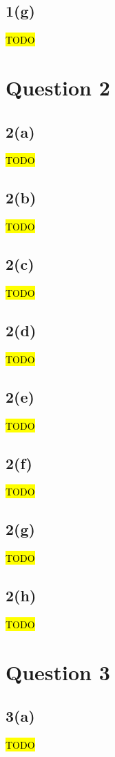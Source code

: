 \documentclass[12pt, a4paper,reqno]{article}
\begin{document}
\subsection*{1(g)}
\hl{TODO}


%
%
\clearpage\section*{Question 2}

\subsection*{2(a)}
\hl{TODO}

\subsection*{2(b)}
\hl{TODO}

\subsection*{2(c)}
\hl{TODO}

\subsection*{2(d)}
\hl{TODO}

\subsection*{2(e)}
\hl{TODO}

\subsection*{2(f)}
\hl{TODO}

\subsection*{2(g)}
\hl{TODO}

\subsection*{2(h)}
\hl{TODO}


%
%
\clearpage\section*{Question 3}

\subsection*{3(a)}
\hl{TODO}
\end{document}
